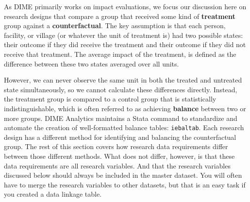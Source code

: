 As DIME primarily works on impact evaluations,
we focus our discussion here on research designs
that compare a group that received
some kind of \textbf{treatment}
group against a \textbf{counterfactual}.
The key assumption is that each
person, facility, or village
(or whatever the unit of treatment is)
had two possible states: their outcome if they did receive the treatment
and their outcome if they did not receive that treatment.
The average impact of the treatment,
is defined as the difference
between these two states averaged over all units.

However, we can never observe the same unit
in both the treated and untreated state simultaneously,
so we cannot calculate these differences directly.
Instead, the treatment group is compared to a control group
that is statistically indistinguishable,
which is often referred to as achieving
\textbf{balance} between two or more groups.
DIME Analytics maintains a Stata command to
standardize and automate the creation of well-formatted balance tables:
\texttt{iebaltab}.
Each research design has a different method for
identifying and balancing the counterfactual group.
The rest of this section covers how research data requirements
differ between those different methods.
What does not differ, however,
is that these data requirements are all research variables.
And that the research variables discussed below
should always be included in the master dataset.
You will often have to merge
the research variables to other datasets,
but that is an easy task
if you created a data linkage table.


